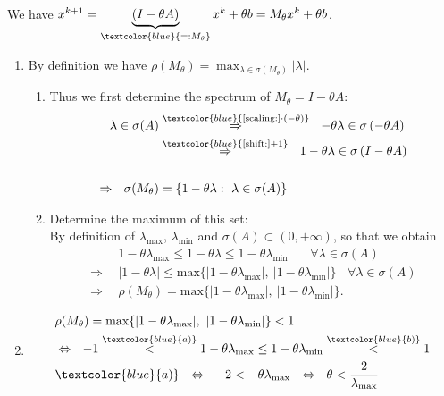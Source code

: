 {\color{solution}
We have $x^{k+1}=\underbrace{(I-\theta A)}_{\textcolor{blue}{=:M_\theta}}x^k+\theta b = M_\theta x^k+\theta b $.
\begin{enumerate}
	\item %
	By definition we have $\rho(M_\theta)=\max_{\lambda\in\sigma(M_\theta)}|\lambda|$.
	\begin{enumerate}
		\item 
		Thus we first determine the spectrum of $M_\theta = I-\theta A$:
		\begin{align*}
		\lambda\in\sigma(A)
		&\stackrel{\textcolor{blue}{\text{[scaling:]}\cdot(-\theta)}}{\Rightarrow}~~
		-\theta\lambda\in\sigma\left(-\theta A\right)\\
		&\stackrel{\textcolor{blue}{\text{[shift:]} +1}}{\Rightarrow}~~
		1-\theta\lambda\in\sigma\left(I-\theta A\right)\\
		\\
		\Rightarrow~~\sigma(M_\theta)&=\{1-\theta\lambda:~\lambda\in\sigma(A)\}
		\end{align*}
		\item 
		Determine the maximum of this set:\\
		By definition of $\lambda_{\text{max}}$, $\lambda_{\text{min}}$ and $\sigma(A)\subset(0,+\infty)$, so that we obtain
		\begin{align*}
		&1-\theta\lambda_{\text{max}}\leq 1-\theta\lambda\leq 1-\theta\lambda_{\text{min}}~~~~~~~~\forall\lambda\in\sigma(A)\\
		\Rightarrow~~&|1-\theta\lambda|\leq\text{max}\{|1-\theta\lambda_{\text{max}}|,~|1-\theta\lambda_{\text{min}}|\}~~~~\forall\lambda\in\sigma(A)\\
		\Rightarrow~~&\rho(M_\theta)=\text{max}\{|1-\theta\lambda_{\text{max}}|,~|1-\theta\lambda_{\text{min}}|\}.
		\end{align*}
	\end{enumerate}
	\item 
	\begin{align*}
	&\rho(M_\theta)=\text{max}\{|1-\theta\lambda_{\text{max}}|,~|1-\theta\lambda_{\text{min}}|\}<1\\
	&\Leftrightarrow~~-1\stackrel{\textcolor{blue}{a)}}{<}1-\theta\lambda_{\text{max}}\leq 1-\theta\lambda_{\text{min}}\stackrel{\textcolor{blue}{b)}}{<}1\\
	&\textcolor{blue}{a)}~~\Leftrightarrow~~-2<-\theta\lambda_{\text{max}}~~\Leftrightarrow~~\theta<\frac{2}{\lambda_{\text{max}}}\\

\end{align*}
\end{enumerate}}
